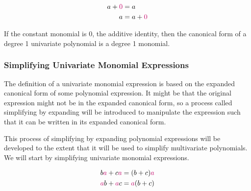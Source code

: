 \begin{definition}
\begin{subequations}
\begin{align}
a+\alert{0} &= a \label{eq:aid1} \\
a &= a+\alert{0} \label{eq:aid2} 
\end{align}
\end{subequations}
\end{definition}

If the constant monomial is 0, the additive identity, then the canonical form of a degree 1 univariate polynomial is a degree 1 monomial.

\subsubsection{Simplifying Univariate Monomial Expressions}

The definition of a univariate monomial expression is based on the expanded canonical form of some polynomial expression.  It might be that the original expression might not be in the expanded canonical form, so a process called \alert{simplifying by expanding} will be introduced to manipulate the expression such that it can be written in its expanded canonical form.

This process of simplifying by expanding polynomial expressions will be developed to the extent that it will be used to simplify multivariate polynomials.  We will start by simplifying univariate monomial expressions.  
  
\begin{definition}
\begin{subequations}
\begin{align}
b\alert{a} + c\alert{a} &= (b+c)\alert{a} \label{eq:dpf1} \\
\alert{a}b + \alert{a}c &= \alert{a}(b+c) \label{eq:dpf2}
\end{align}
\end{subequations}
\end{definition}


